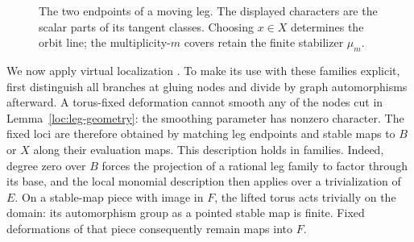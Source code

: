 \begin{figure}[htbp]
\centering
{}
\caption{The two endpoints of a moving leg. The displayed characters
are the scalar parts of its tangent classes. Choosing $x\in X$
determines the orbit line; the multiplicity-$m$ covers retain the
finite stabilizer $\mu_m$.}\label{loc:figure}
\end{figure}

We now apply virtual localization \cite{GP}. To make its use with these
families explicit, first distinguish all branches at gluing nodes and
divide by graph automorphisms afterward. A torus-fixed deformation
cannot smooth any of the nodes cut in Lemma~\ref{loc:leg-geometry}:
the smoothing parameter has nonzero character. The fixed loci are
therefore obtained by matching leg endpoints and stable maps to $B$ or
$X$ along their evaluation maps. This description holds in families.
Indeed, degree zero over $B$ forces the projection of a rational leg
family to factor through its base, and the local monomial description
then applies over a trivialization of $E$. On a stable-map piece with
image in $F$, the lifted torus acts trivially on the domain: its
automorphism group as a pointed stable map is finite. Fixed deformations
of that piece consequently remain maps into $F$.

